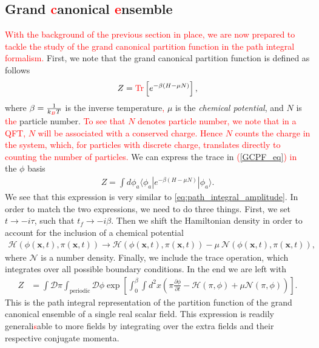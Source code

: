         \subsection{Grand \textcolor{red}{c}anonical \textcolor{red}{e}nsemble} \label{GCE_sec}
        \textcolor{red}{With the background of the previous section in place, we are now prepared to tackle the study of the grand canonical partition function in the path integral formalism.} First, we note that the grand canonical partition function is defined as follows
        \begin{align}
            Z= \textcolor{red}{\mathrm{Tr}} \left[e^{-\beta \left( H - \mu N \right)}\right], \label{GCPF_eq}
        \end{align}
        where $\beta = \frac{1}{k_{\textcolor{red}{B}} T}$ \colorbox{red}{ } is the inverse temperature\textcolor{red}{,} $\mu$ is the \textit{chemical potential}, and $N$ is \textcolor{red}{the} particle number. \textcolor{red}{To see that $N$ denotes particle number, we note that in a QFT, $N$ will be associated with a conserved charge. Hence $N$ counts the charge in the system, which, for particles with discrete charge, translates directly to counting the number of particles.} We can express the trace in \textcolor{red}{(\ref{GCPF_eq}) in} the $\phi$ basis
        \begin{align}
            Z= \int d \phi_a \langle \phi_a | e^{-\beta \left( H - \mu N \right)} | \phi_a \rangle.
        \end{align}
        We see that this expression is very similar to \ref{eq:path_integral_amplitude}. In order to match the two expressions, we need to do three things. First, we set $t \rightarrow -i \tau$, such that $t_f \rightarrow -i \beta$. Then we shift the Hamiltonian density in order to account for the inclusion of a chemical potential
        \begin{align}
            \mathcal{H} \left(\phi(\bm{x},t),\pi (\bm{x},t) \right) \rightarrow \mathcal{H}\left(\phi(\bm{x},t),\pi (\bm{x},t) \right) - \mu \ \mathcal{N}\left(\phi(\bm{x},t),\pi (\bm{x},t) \right),
        \end{align}
        where $\mathcal{N}$ is a number density. Finally, we include the trace operation, which integrates over all possible boundary conditions. In the end we are left with
        \begin{align}
            Z &= \int \mathcal{D} \pi \int_{\text{periodic}} \mathcal{D} \phi \exp \left[ \int_0^{\beta} \int d^2x \left(\pi \frac{\partial \phi}{\partial t} - \mathcal{H}(\pi, \phi) + \mu \mathcal{N}(\pi, \phi) \right) \right] \label{eq:partition_function}.
        \end{align}
This is the path integral representation of the partition function of the grand canonical ensemble of a single real scalar field. This expression is readily generali\textcolor{red}{s}able to more fields by integrating over the extra fields and their respective conjugate momenta.


